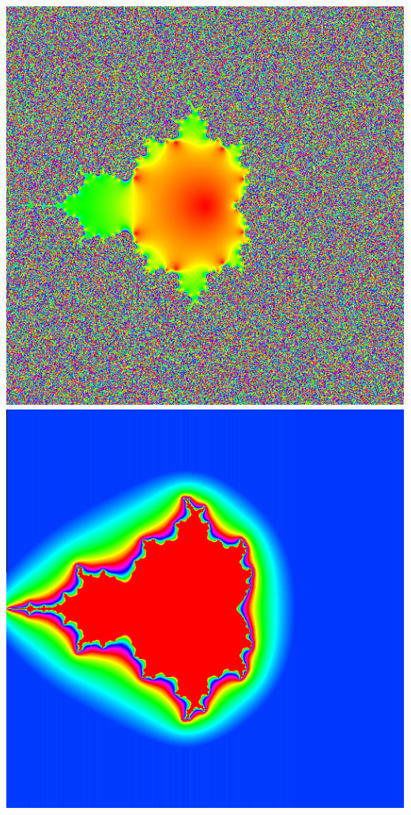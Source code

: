 \documentclass[../resume.tex]{subfiles}
\begin{document}
\noindent
\includegraphics[scale=0.15]{../TAing/mandel/9.png}
\includegraphics[scale=0.15]{../TAing/mandel/10.png}
\end{document}
